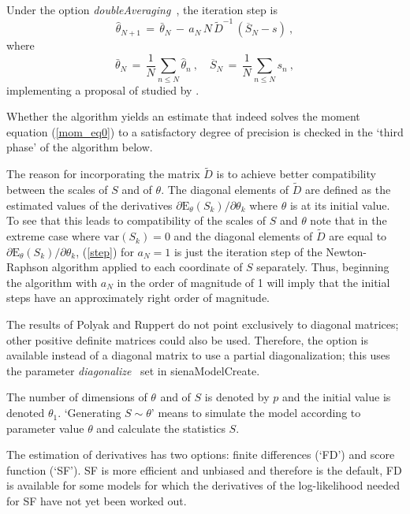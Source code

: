 \documentclass[a4paper,12pt,fleqn]{article}
\newcommand{\E}{\mbox{E}}
\newcommand{\var}{\mbox{var}}
\renewcommand{\th}[1]{$\theta_{#1}$}
\newcommand{\nm}[1]{\textsf{\small #1}}
\newcommand{\nnm}[1]{\textsf{\small\textit{#1}\ }}
\begin{document}
Under the option \nnm{doubleAveraging}, the iteration step is
\begin{equation}
 \hat{\theta}_{N+1} \,=\, \bar{\theta}_N \, - \, a_N\, N\,{\tilde{D}}^{-1} \, (\overline S_N - s)~,   \label{step.double}
\end{equation}
where
\[
  \bar{\theta}_N \,=\, \frac1N \sum_{n \leq N} \hat\theta_n \ , \hspace{1em}
  \overline S_N \,=\, \frac1N \sum_{n \leq N} s_n \ ,
\]
implementing a proposal of \citet{bather1989} studied by
\citet{SchwabeWalk96}.

Whether the algorithm yields an estimate that indeed solves
the moment equation (\ref{mom_eq0}) to a satisfactory degree of precision
is checked in the `third phase' of the algorithm below.

The reason for incorporating the matrix ${\tilde{D}}$ is to achieve better compatibility
between the scales of $S$ and of $\theta$.
The diagonal elements of ${\tilde{D}}$ are defined as the estimated values of the derivatives
$\partial \E_{\theta}(S_k) / \partial \theta_k$ where $\theta$ is
at its initial value.
To see that this leads to compatibility of the scales of $S$ and $\theta$
note that in the extreme case where $\var(S_k) = 0$ and the diagonal elements of ${\tilde{D}}$
are equal to
$\partial \E_{\theta}(S_k) / \partial \theta_k$,
(\ref{step}) for $a_N = 1$ is just the iteration step of the Newton-Raphson
algorithm applied to each coordinate of $S$ separately.
Thus, beginning the algorithm with $a_N$ in the order of magnitude of 1
will imply that the initial steps have an approximately right order of magnitude.

The results of Polyak and Ruppert do not point exclusively
to diagonal matrices; other positive definite matrices could also be used.
Therefore, the option is available instead of a diagonal matrix
to use a partial diagonalization; this uses the parameter
\nnm{diagonalize} set in \nm{sienaModelCreate}.

The number of dimensions of \th{} and of $S$ is denoted by $p$
and the initial value is denoted \th{1}.
`Generating $ S \sim \theta $' means to simulate the model
according to parameter value $\theta$ and calculate the statistics $S$.

The estimation of derivatives has two options: finite differences (`FD')
and score function (`SF').
SF is more efficient and unbiased
\citep{SchweinbergerSnijders07a}
and therefore is the default,
FD is available for some models for which
the derivatives of the log-likelihood needed for SF have not yet been
worked out.
\end{document}
